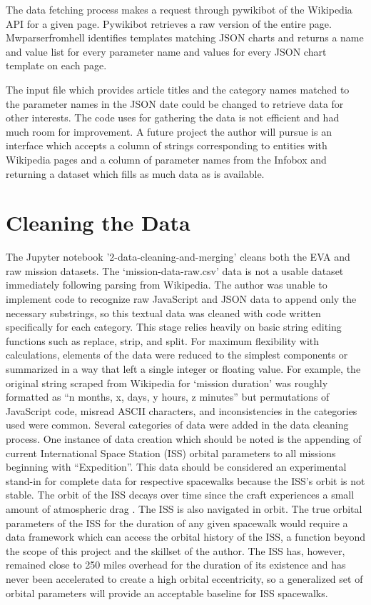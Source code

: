 \documentclass[sigconf]{acmart}
\begin{document}
The data fetching process makes a request through pywikibot \cite{Wikimedia} of the Wikipedia API for a given page. Pywikibot retrieves a raw version of the entire page. Mwparserfromhell \cite{Kurtovic2017} identifies templates matching JSON charts and returns a name and value list for every parameter name and values for every JSON chart template on each page. 

The input file which provides article titles and the category names matched to the parameter names in the JSON date could be changed to retrieve data for other interests. The code uses for gathering the data is not efficient and had much room for improvement. A future project the author will pursue is an interface which accepts a column of strings corresponding to entities with Wikipedia pages and a column of parameter names from the Infobox and returning a dataset which fills as much data as is available. 

\section{Cleaning the Data}
The Jupyter notebook '2-data-cleaning-and-merging' cleans both the EVA and raw mission datasets. The ‘mission-data-raw.csv’ data is not a usable dataset immediately following parsing from Wikipedia. The author was unable to implement code to recognize raw JavaScript and JSON data to append only the necessary substrings, so this textual data was cleaned with code written specifically for each category. This stage relies heavily on basic string editing functions such as replace, strip, and split. For maximum flexibility with calculations, elements of the data were reduced to the simplest components or summarized in a way that left a single integer or floating value. 
For example, the original string scraped from Wikipedia for ‘mission duration’ was roughly formatted as “n months, x, days, y hours, z minutes” but permutations of JavaScript code, misread ASCII characters, and inconsistencies in the categories used were common. Several categories of data were added in the data cleaning process. 
One instance of data creation which should be noted is the appending of current International Space Station (ISS) orbital parameters to all missions beginning with “Expedition”. This data should be considered an experimental stand-in for complete data for respective spacewalks because the ISS’s orbit is not stable. The orbit of the ISS decays over time since the craft experiences a small amount of atmospheric drag \cite{Hutchinson2013}. The ISS is also navigated in orbit. The true orbital parameters of the ISS for the duration of any given spacewalk would require a data framework which can access the orbital history of the ISS, a function beyond the scope of this project and the skillset of the author. The ISS has, however, remained close to 250 miles overhead for the duration of its existence and has never been accelerated to create a high orbital eccentricity, so a generalized set of orbital parameters will provide an acceptable baseline for ISS spacewalks.
\end{document}
